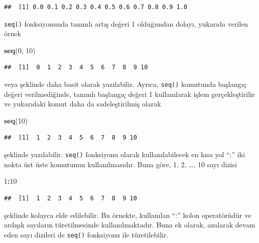\documentclass[
]{book}
\newenvironment{Shaded}{\begin{snugshade}}{\end{snugshade}}
\newcommand{\DecValTok}[1]{\textcolor[rgb]{0.00,0.00,0.81}{#1}}
\newcommand{\FunctionTok}[1]{\textcolor[rgb]{0.13,0.29,0.53}{\textbf{#1}}}
\newcommand{\NormalTok}[1]{#1}
\newcommand{\SpecialCharTok}[1]{\textcolor[rgb]{0.81,0.36,0.00}{\textbf{#1}}}
\begin{document}
\begin{verbatim}
##  [1] 0.0 0.1 0.2 0.3 0.4 0.5 0.6 0.7 0.8 0.9 1.0
\end{verbatim}

\texttt{seq()} fonksiyonunda tanımlı artış değeri 1 olduğundan dolayı, yukarıda verilen örnek

\begin{Shaded}
\begin{Highlighting}[]
\FunctionTok{seq}\NormalTok{(}\DecValTok{0}\NormalTok{, }\DecValTok{10}\NormalTok{)}
\end{Highlighting}
\end{Shaded}

\begin{verbatim}
##  [1]  0  1  2  3  4  5  6  7  8  9 10
\end{verbatim}

veya şeklinde daha basit olarak yazılabilir. Ayrıca, \texttt{seq()} komutunda başlangıç değeri verilmediğinde, tanımlı başlangıç değeri 1 kullanılarak işlem gerçekleştirilir ve yukarıdaki komut daha da sadeleştirilmiş olarak

\begin{Shaded}
\begin{Highlighting}[]
\FunctionTok{seq}\NormalTok{(}\DecValTok{10}\NormalTok{)}
\end{Highlighting}
\end{Shaded}

\begin{verbatim}
##  [1]  1  2  3  4  5  6  7  8  9 10
\end{verbatim}

şeklinde yazılabilir. \texttt{seq()} fonksiyonu olarak kullanılabilecek en kısa yol ``:'' iki nokta üst üste komutunun kullanılmasıdır. Buna göre, 1, 2, \ldots, 10 sayı dizisi

\begin{Shaded}
\begin{Highlighting}[]
\DecValTok{1}\SpecialCharTok{:}\DecValTok{10}
\end{Highlighting}
\end{Shaded}

\begin{verbatim}
##  [1]  1  2  3  4  5  6  7  8  9 10
\end{verbatim}

şeklinde kolayca elde edilebilir. Bu örnekte, kullanılan ``:'' kolon operatörüdür ve ardışık sayıların türetilmesinde kullanılmaktadır. Buna ek olarak, azalarak devam eden sayı dizileri de \texttt{seq()} fonksiyonu ile türetilebilir.
\end{document}
